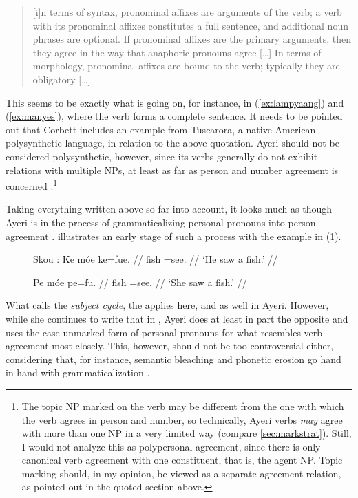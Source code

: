\blockcquote[99--100]{corbett2006}{[i]n terms of syntax, pronominal affixes are
arguments of the verb; a verb with its pronominal affixes constitutes a full
sentence, and additional noun phrases are optional. If pronominal affixes are
the primary arguments, then they agree in the way that anaphoric pronouns agree
[…] In terms of morphology, pronominal affixes are bound to the verb; typically
they are obligatory […].}

\noindent This seems to be exactly what is going on, for instance, in
(\ref{ex:lampyaang}) and (\ref{ex:manyes}), where the verb forms a complete
sentence. It needs to be pointed out that Corbett includes an example from
Tuscarora, a native American polysynthetic language, in relation to the above
quotation. Ayeri should not be considered polysynthetic, however, since its
verbs generally do not exhibit relations with multiple NPs, at least as far as
person and number agreement is concerned
\citep[45--46]{comrie1989}.\footnote{The topic NP marked on the verb may be
different from the one with which the verb agrees in person and number, so
technically, Ayeri verbs \emph{may} agree with more than one NP in a very
limited way (compare \autoref{sec:markstrat}). Still, I would not analyze this
as polypersonal agreement, since there is only canonical verb agreement with
one constituent, that is, the agent NP. Topic marking should, in my opinion, be
viewed as a separate agreement relation, as pointed out in the quoted section
above.}

Taking everything written above so far into account, it looks much as though
Ayeri is in the process of grammaticalizing personal pronouns into person
agreement \parencites[42--45]{lehmann2015}[493--497]{vangelderen2011}.
\citet{corbett2006} illustrates an early stage of such a process with the
example in (\ref{ex:agrgen}).

\begin{figure}[h]
\pex\label{ex:agrgen}%
Skou \parencite[76--77]{corbett2006}:
\a\begingl
	\gla Ke móe ke=fue.  //
	\glb \TsgM{} fish \TsgM{}=​see.\TsgM{} {} //
	\glft `He saw a fish.' //
\endgl

\a\begingl
	\gla Pe móe pe=fu.  //
	\glb \TsgF{} fish \TsgF{}=​see.\TsgF{} {} //
	\glft `She saw a fish.' //
\endgl
\xe
\end{figure}

What \citet{vangelderen2011} calls the \emph{subject cycle}, the
 applies here, and as well in
Ayeri. However, while she continues to write that in
, Ayeri does at least in
part the opposite and uses the case-unmarked form of personal pronouns for
what resembles verb agreement most closely. This, however, should not be too
controversial either, considering that, for instance, semantic bleaching and
phonetic erosion go hand in hand with grammaticalization 
\parencites[136--137]{lehmann2015}[497]{vangelderen2011}.

